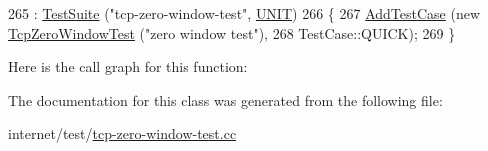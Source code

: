 \begin{DoxyCode}
265                             : \hyperlink{classns3_1_1TestSuite_a904b0c40583b744d30908aeb94636d1a}{TestSuite} (\textcolor{stringliteral}{"tcp-zero-window-test"}, \hyperlink{classns3_1_1TestSuite_a1ebfcab34ec8161e085e8e3a1855eae0a3885375a3787abf60431f8454b3cadbd}{UNIT})
266   \{
267     \hyperlink{classns3_1_1TestCase_a3718088e3eefd5d6454569d2e0ddd835}{AddTestCase} (\textcolor{keyword}{new} \hyperlink{classTcpZeroWindowTest}{TcpZeroWindowTest} (\textcolor{stringliteral}{"zero window test"}),
268                  TestCase::QUICK);
269   \}
\end{DoxyCode}


Here is the call graph for this function\+:




The documentation for this class was generated from the following file\+:\begin{DoxyCompactItemize}
\item 
internet/test/\hyperlink{tcp-zero-window-test_8cc}{tcp-\/zero-\/window-\/test.\+cc}\end{DoxyCompactItemize}
